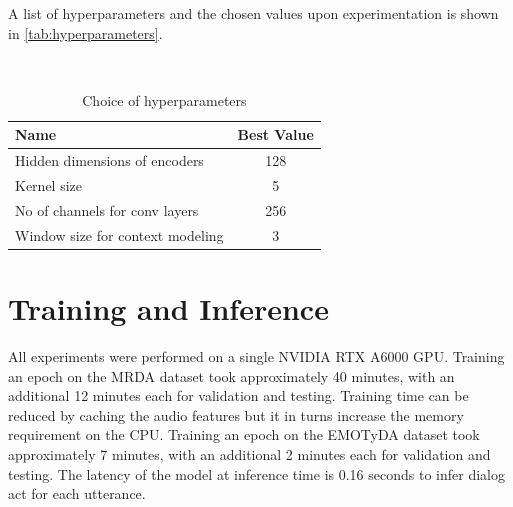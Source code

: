 A list of hyperparameters and the chosen values upon experimentation is shown in \autoref{tab:hyperparameters}.

\

\begin{table}
  \centering
  \small
  \begin{tabularx}{\linewidth}{Xc}
    \toprule
    Name & Best Value\\
    \midrule
    Hidden dimensions of encoders & 128\\ 
    Kernel size & 5\\
    No of channels for conv layers & 256\\
    Window size for context modeling & 3\\
    \bottomrule
  \end{tabularx}
  \caption{Choice of hyperparameters}
  \label{tab:hyperparameters}
\end{table}




\section{Training and Inference}
\label{sec:model_training}
All experiments were performed on a single NVIDIA RTX A6000 GPU.
Training an epoch on the MRDA dataset took approximately 40 minutes, with an additional 12 minutes each for validation and testing. Training time can be reduced by caching the audio features but it in turns increase the memory requirement on the CPU. Training an epoch on the EMOTyDA dataset took approximately 7 minutes, with an additional 2 minutes each for validation and testing. The latency of the model at inference time is 0.16 seconds to infer dialog act for each utterance.